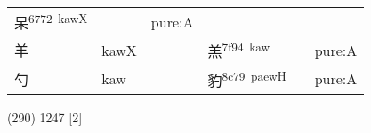 \documentclass[14pt,a4paper]{scrartcl}
\begin{document}
\begin{longtable}[c]{@{}llllll@{}}
\begin{minipage}[t]{0.14\columnwidth}
杲\textsuperscript{6772~kawX}
\strut\end{minipage} &
\begin{minipage}[t]{0.14\columnwidth}\raggedright\strut
\strut\end{minipage} &
\begin{minipage}[t]{0.14\columnwidth}\raggedright\strut
pure:A
\strut\end{minipage}\tabularnewline
\begin{minipage}[t]{0.14\columnwidth}\raggedright\strut
羊
\strut\end{minipage} &
\begin{minipage}[t]{0.14\columnwidth}\raggedright\strut
kawX
\strut\end{minipage} &
\begin{minipage}[t]{0.14\columnwidth}\raggedright\strut
\strut\end{minipage} &
\begin{minipage}[t]{0.14\columnwidth}\raggedright\strut
羔\textsuperscript{7f94~kaw}
\strut\end{minipage} &
\begin{minipage}[t]{0.14\columnwidth}\raggedright\strut
\strut\end{minipage} &
\begin{minipage}[t]{0.14\columnwidth}\raggedright\strut
pure:A
\strut\end{minipage}\tabularnewline
\begin{minipage}[t]{0.14\columnwidth}\raggedright\strut
勺
\strut\end{minipage} &
\begin{minipage}[t]{0.14\columnwidth}\raggedright\strut
kaw
\strut\end{minipage} &
\begin{minipage}[t]{0.14\columnwidth}\raggedright\strut
\strut\end{minipage} &
\begin{minipage}[t]{0.14\columnwidth}\raggedright\strut
豹\textsuperscript{8c79~paewH}
\strut\end{minipage} &
\begin{minipage}[t]{0.14\columnwidth}\raggedright\strut
\strut\end{minipage} &
\begin{minipage}[t]{0.14\columnwidth}\raggedright\strut
pure:A
\strut\end{minipage}\tabularnewline
\bottomrule
\end{longtable}

(290) 1247 {[}2{]}
\end{document}
